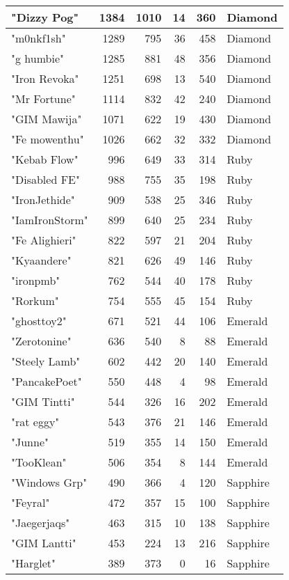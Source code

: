 \documentclass{article}
\begin{document}
\begin{table}[htbp]
\begin{tabular}{|l|r|r|r|r|l|}
"Dizzy Pog" & 1384 & 1010 & 14 & 360 & Diamond \\ \hline
"m0nkf1sh" & 1289 & 795 & 36 & 458 & Diamond \\ \hline
"g humbie" & 1285 & 881 & 48 & 356 & Diamond \\ \hline
"Iron Revoka" & 1251 & 698 & 13 & 540 & Diamond \\ \hline
"Mr Fortune" & 1114 & 832 & 42 & 240 & Diamond \\ \hline
"GIM Mawija" & 1071 & 622 & 19 & 430 & Diamond \\ \hline
"Fe mowenthu" & 1026 & 662 & 32 & 332 & Diamond \\ \hline
"Kebab Flow" & 996 & 649 & 33 & 314 & Ruby \\ \hline
"Disabled FE" & 988 & 755 & 35 & 198 & Ruby \\ \hline
"IronJethide" & 909 & 538 & 25 & 346 & Ruby \\ \hline
"IamIronStorm" & 899 & 640 & 25 & 234 & Ruby \\ \hline
"Fe Alighieri" & 822 & 597 & 21 & 204 & Ruby \\ \hline
"Kyaandere" & 821 & 626 & 49 & 146 & Ruby \\ \hline
"ironpmb" & 762 & 544 & 40 & 178 & Ruby \\ \hline
"Rorkum" & 754 & 555 & 45 & 154 & Ruby \\ \hline
"ghosttoy2" & 671 & 521 & 44 & 106 & Emerald \\ \hline
"Zerotonine" & 636 & 540 & 8 & 88 & Emerald \\ \hline
"Steely Lamb" & 602 & 442 & 20 & 140 & Emerald \\ \hline
"PancakePoet" & 550 & 448 & 4 & 98 & Emerald \\ \hline
"GIM Tintti" & 544 & 326 & 16 & 202 & Emerald \\ \hline
"rat eggy" & 543 & 376 & 21 & 146 & Emerald \\ \hline
"Junne" & 519 & 355 & 14 & 150 & Emerald \\ \hline
"TooKlean" & 506 & 354 & 8 & 144 & Emerald \\ \hline
"Windows Grp" & 490 & 366 & 4 & 120 & Sapphire \\ \hline
"Feyral" & 472 & 357 & 15 & 100 & Sapphire \\ \hline
"Jaegerjaqs" & 463 & 315 & 10 & 138 & Sapphire \\ \hline
"GIM Lantti" & 453 & 224 & 13 & 216 & Sapphire \\ \hline
"Harglet" & 389 & 373 & 0 & 16 & Sapphire \\ \hline

\end{tabular}
\end{table}
\end{document}
